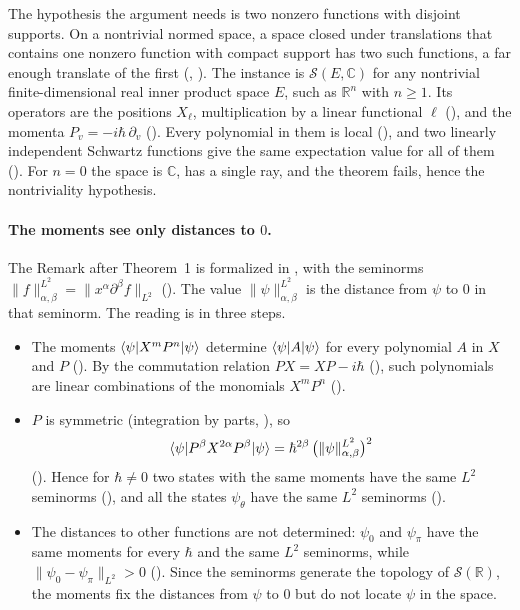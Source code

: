 \documentclass[11pt]{article}
\begin{document}
The hypothesis the argument needs is two nonzero functions with disjoint supports. On a nontrivial
normed space, a space closed under translations that contains one nonzero function with compact
support has two such functions, a far enough translate of the first
(, ).
The instance is $\mathcal{S}(E, \mathbb{C})$ for any nontrivial finite-dimensional real inner
product space $E$, such as $\mathbb{R}^n$ with $n \ge 1$. Its operators are the positions
$X_\ell$, multiplication by a linear functional $\ell$ (), and the momenta
$P_v = -i\hbar\,\partial_v$ (). Every polynomial in them is local
(), and two linearly independent Schwartz functions give
the same expectation value for all of them (). For
$n = 0$ the space is $\mathbb{C}$, has a single ray, and the theorem fails, hence the
nontriviality hypothesis.

\paragraph{The moments see only distances to $0$.} The Remark after Theorem~1 is formalized in
, with the seminorms $\|f\|^{L^2}_{\alpha,\beta} = \|x^\alpha \partial^\beta
f\|_{L^2}$ (). The value $\|\psi\|^{L^2}_{\alpha,\beta}$ is the
distance from $\psi$ to $0$ in that seminorm. The reading is in three steps.
\begin{itemize}
\item The moments $\braket{\psi|X^mP^n|\psi}$ determine $\braket{\psi|A|\psi}$ for every
  polynomial $A$ in $X$ and $P$ (). By the commutation
  relation $PX = XP - i\hbar$ (), such polynomials are linear combinations of the
  monomials $X^mP^n$ ().
\item $P$ is symmetric (integration by parts, ), so
  \[
    \braket{\psi|P^\beta X^{2\alpha} P^\beta|\psi} = \hbar^{2\beta}\,
    \bigl(\|\psi\|^{L^2}_{\alpha,\beta}\bigr)^2
  \]
  (). Hence for $\hbar \ne 0$ two states with the same
  moments have the same $L^2$ seminorms (), and all the states
  $\psi_\theta$ have the same $L^2$ seminorms ().
\item The distances to other functions are not determined: $\psi_0$ and $\psi_\pi$ have the same
  moments for every $\hbar$ and the same $L^2$ seminorms, while $\|\psi_0 - \psi_\pi\|_{L^2} > 0$
  (). Since the seminorms generate the topology of
  $\mathcal{S}(\mathbb{R})$, the moments fix the distances from $\psi$ to $0$ but do not locate
  $\psi$ in the space.
\end{itemize}
\end{document}
